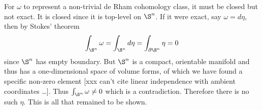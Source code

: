 \documentclass[10pt]{article}
\numberwithin{equation}{subsection}
\begin{document}
For $\omega$ to represent a non-trivial de Rham cohomology class, it must be
closed but not exact.  It is closed since it is top-level on $\S^n$.
If it were exact, say $\omega=d\eta$, then by Stokes' theorem
$$
	\int_{\S^n}\omega =
	\int_{\S^n}d\eta =
	\int_{\D\S^n}\eta = 0
$$
since $\S^n$ has empty boundary.  But $\S^n$ is a compact, orientable manifold
and thus has a one-dimensional space of volume forms, of which we have found a
specific non-zero element [xxx can't cite linear independence with ambient
coordinates \ldots].  Thus $\int_{\S^n}\omega \ne 0$ which is a contradiction.
Therefore there is no such $\eta$.  This is all that remained to be shown.

\end{document}
